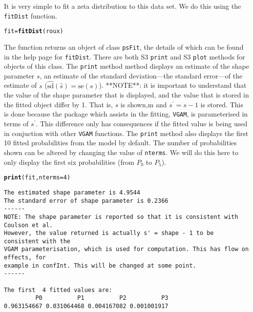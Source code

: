 \documentclass{article}\usepackage[]{graphicx}\usepackage[]{xcolor}
\makeatletter
\newcommand{\hlnum}[1]{\textcolor[rgb]{0.686,0.059,0.569}{#1}}%
\newcommand{\hlstd}[1]{\textcolor[rgb]{0.345,0.345,0.345}{#1}}%
\newcommand{\hlkwb}[1]{\textcolor[rgb]{0.69,0.353,0.396}{#1}}%
\newcommand{\hlkwc}[1]{\textcolor[rgb]{0.333,0.667,0.333}{#1}}%
\newcommand{\hlkwd}[1]{\textcolor[rgb]{0.737,0.353,0.396}{\textbf{#1}}}%
\newenvironment{kframe}{%
 \def\at@end@of@kframe{}%
 \ifinner\ifhmode%
  \def\at@end@of@kframe{\end{minipage}}%
  \begin{minipage}{\columnwidth}%
 \fi\fi%
 \def\FrameCommand##1{\hskip\@totalleftmargin \hskip-\fboxsep
 \colorbox{shadecolor}{##1}\hskip-\fboxsep
     \hskip-\linewidth \hskip-\@totalleftmargin \hskip\columnwidth}%
 \MakeFramed {\advance\hsize-\width
   \@totalleftmargin\z@ \linewidth\hsize
   \@setminipage}}%
 {\par\unskip\endMakeFramed%
 \at@end@of@kframe}
\newenvironment{knitrout}{}{} %
\newcommand{\rcode}[1]{\lstinline[language=R,basicstyle=\normalsize\ttfamily]!#1!}
\makeatother
\begin{document}
It is very simple to fit a zeta distribution to this data set. We do this using the \rcode{fitDist} function.
\begin{knitrout}
\color{fgcolor}\begin{kframe}
\begin{alltt}
\hlstd{fit} \hlkwb{=} \hlkwd{fitDist}\hlstd{(roux)}
\end{alltt}
\end{kframe}
\end{knitrout}
The function returns an object of class \rcode{psFit}, the details of which can be found in the help page for \rcode{fitDist}. There are both S3 \rcode{print} and S3 \rcode{plot} methods for objects of this class. The \rcode{print} method method displays an estimate of the shape parameter $s$, an estimate of the standard deviation---the standard error---of the estimate of $s$ ($\widehat{\mathrm{sd}}(\hat{s})=\mathrm{se}(\hat{s})$). **NOTE**: it is important to understand that the value of the shape parameter that is displayed, and the value that is stored in the fitted object differ by 1. That is, $s$ is shown,m and $s^\prime = s - 1$ is stored. This is done because the package which assists in the fitting, \rcode{VGAM}, is parameterised in terms of $s^\prime$. This difference only has consequences if the fitted value is being used in conjuction with other \rcode{VGAM} functions.   The \rcode{print} method also displays the first 10 fitted probabilities from the model by default. The number of probabilities shown can be altered by changing the value of \rcode{nterms}. We will do this here to only display the first six probabilities (from $P_0$ to $P_5$).
\begin{knitrout}
\color{fgcolor}\begin{kframe}
\begin{alltt}
\hlkwd{print}\hlstd{(fit,} \hlkwc{nterms} \hlstd{=} \hlnum{4}\hlstd{)}
\end{alltt}
\begin{verbatim}
The estimated shape parameter is 4.9544 
The standard error of shape parameter is 0.2366 
------
NOTE: The shape parameter is reported so that it is consistent with Coulson et al.
However, the value returned is actually s' = shape - 1 to be consistent with the 
VGAM parameterisation, which is used for computation. This has flow on effects, for
example in confInt. This will be changed at some point.
------

The first  4 fitted values are:
         P0          P1          P2          P3 
0.963154667 0.031064468 0.004167082 0.001001917 
\end{verbatim}
\end{kframe}
\end{knitrout}
\end{document}
